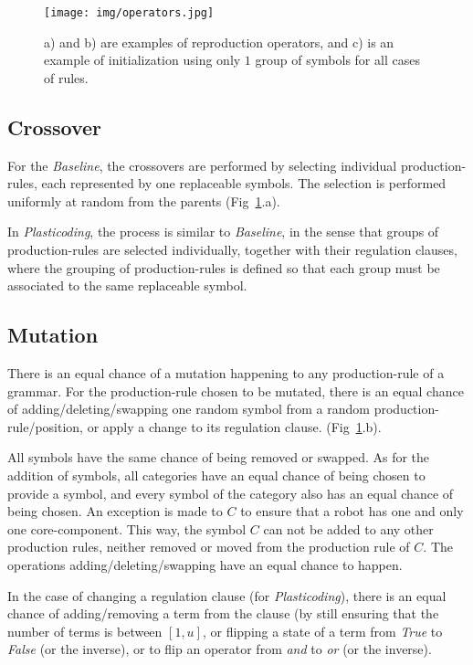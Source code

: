 \documentclass[utf8]{frontiersSCNS} %
\begin{document}
\begin{figure}[t]
    \begin{center}
      \texttt{[image: img/operators.jpg]}  
       \end{center}
           \caption{a) and b) are examples of reproduction operators, and c) is an example of initialization using only $1$ group of symbols for all cases of rules.}
        \label{fig:operators}
\end{figure}

\subsection{Crossover}
\label{sec:crossover}

For the \textit{Baseline}, the crossovers are performed by selecting individual production-rules, each represented by one replaceable  symbols. The selection is performed uniformly at random from the parents (Fig~\ref{fig:operators}.a). 

In \textit{Plasticoding}, the process is similar to \textit{Baseline}, in the sense that groups of production-rules are selected individually, together with their regulation clauses, where the grouping of production-rules is defined so that each group must be associated to the same replaceable symbol.

\subsection{Mutation}
\label{sec:mutation}

  There is an equal chance of a mutation happening to any production-rule of a grammar. For the production-rule chosen to be mutated, there is an equal chance of adding/deleting/swapping one random symbol from a random production-rule/position, or apply a change to its regulation clause. (Fig~\ref{fig:operators}.b). 
  
 All symbols have the same chance of being removed or swapped. As for the addition of symbols, all categories have an equal chance of being chosen to provide a symbol, and every symbol of the category also has an equal chance of being chosen. An exception is made to $C$ to ensure that a robot has one and only one core-component. This way, the symbol $C$ can not be added to any other production rules, neither removed or moved from the production rule of $C$. The operations adding/deleting/swapping have an equal chance to happen.
 
 In the case of changing a regulation clause (for \textit{Plasticoding}), there is an equal chance of adding/removing a term from the clause (by still ensuring that the number of terms is between $[1,u]$, or flipping a state of a term from \textit{True} to \textit{False} (or the inverse), or to flip an operator from \textit{and} to \textit{or} (or the inverse). 
 
\end{document}
